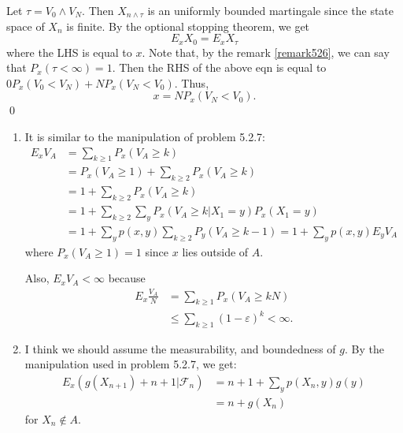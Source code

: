 \begin{problem}[5.2.8]\hfill
	
	Let $\tau = V_0 \wedge V_N$.
	Then $X_{n\wedge \tau}$ is an uniformly bounded martingale since the state space of $X_n$ is finite.
	By the optional stopping theorem, we get
	\[
		E_x X_0 = E_x X_\tau
	\]
	where the LHS is equal to $x$.
	Note that, by the remark \ref{remark526}, we can say that $P_x\left( \tau < \infty \right) = 1$.
	Then the RHS of the above eqn is equal to $0 P_x\left( V_0 < V_N \right) + NP_x\left( V_N < V_0 \right)$.
	Thus,
	\[
		x = N P_x\left( V_N < V_0 \right).
	\]
	\qed
\end{problem}

\begin{problem}[5.2.11]\hfill
	
	\begin{enumerate}
		\item It is similar to the manipulation of problem 5.2.7: 
			\[
				\begin{split}
					E_x V_A & = \sum_{k \geq 1}P_x\left( V_A \geq k \right) \\
					& = P_x \left( V_A \geq 1 \right) + \sum_{k\geq 2}P_x \left( V_A \geq k \right) \\
					& = 1 + \sum_{k\geq 2 } P_x \left( V_A \geq k \right) \\
					& = 1+ \sum_{k\geq 2} \sum_{y}P_x\left( V_A \geq k \lvert X_1 = y \right)P_x\left( X_1 = y \right) \\
					& = 1+ \sum_{y}p(x, y) \sum_{k\geq 2 }P_y\left( V_A \geq k-1 \right) = 1+\sum_y p(x, y)E_y V_A
				\end{split}
			\]
			where $P_x\left( V_A \geq 1 \right) = 1$ since $x$ lies outside of $A$.

			Also, $E_x V_A < \infty$ because
			\[
				\begin{split}
					E_x \frac{V_A}{N} & = \sum_{k\geq 1} P_x\left( V_A \geq kN \right) \\
					&\leq \sum_{k\geq 1}\left( 1-\varepsilon \right)^k < \infty.
				\end{split}
			\]

		\item I think we should assume the measurability, and boundedness of $g$.
			By the manipulation used in problem 5.2.7, we get:
			\[
				\begin{split}
					E_x\left( g(X_{n+1}) + n+1 \lvert \mathcal{F}_n \right)
					&= n+1+\sum_y p(X_n, y)g(y) \\
					&= n+g(X_n)
				\end{split}
			\]
			for $X_n \notin A$.
			

\end{enumerate}
\end{problem}
